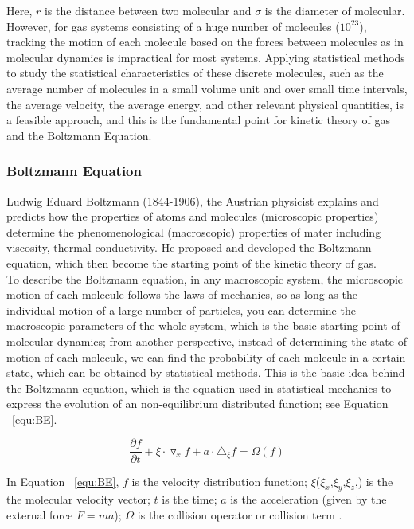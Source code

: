 Here, $r$ is the distance between two molecular and $\sigma$ is the diameter of molecular.\\

However, for gas systems consisting of a huge number of molecules ($10^{23}$), tracking the motion of each molecule based on the forces between molecules as in molecular dynamics is impractical for most systems. Applying statistical methods to study the statistical characteristics of these discrete molecules, such as the average number of molecules in a small volume unit and over small time intervals, the average velocity, the average energy, and other relevant physical quantities, is a feasible approach, and this is the fundamental point for kinetic theory of gas and the Boltzmann Equation.

\subsubsection{Boltzmann Equation}
Ludwig Eduard Boltzmann (1844-1906), the Austrian physicist explains and predicts how the properties of atoms and molecules (microscopic properties) determine the phenomenological (macroscopic) properties of mater including viscosity, thermal conductivity\cite{lbmmbook}. He proposed and developed the Boltzmann equation, which then become the starting point of the kinetic theory of gas.\\

To describe the Boltzmann equation, in any macroscopic system, the microscopic motion of each molecule follows the laws of mechanics, so as long as the individual motion of a large number of particles, you can determine the macroscopic parameters of the whole system, which is the basic starting point of molecular dynamics; from another perspective, instead of determining the state of motion of each molecule, we can find the probability of each molecule in a certain state, which can be obtained by statistical methods. This is the basic idea behind the Boltzmann equation, which is the equation used in statistical mechanics to express the evolution of an non-equilibrium distributed function; see Equation ~\ref{equ:BE}.

\begin{equation}
\label{equ:BE}
    \frac {\partial f}{\partial t} + \xi \cdot \triangledown _x f + a \cdot \triangle _ \xi f = \Omega (f)
\end{equation}

In Equation ~\ref{equ:BE}, $f$ is the velocity distribution function; $\xi$($\xi_x$,$\xi_y$,$\xi_z$,) is the the molecular velocity vector; $t$ is the time; $a$ is the acceleration (given by the external force $F=ma$); $\Omega$ is the collision operator or collision term \cite{succi2001lattice}.

